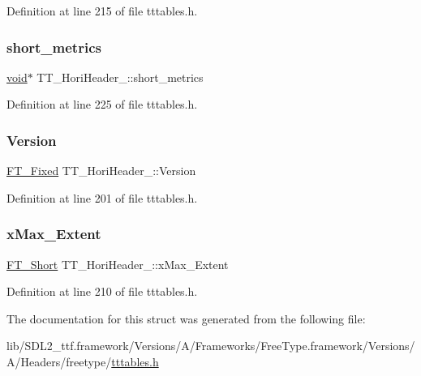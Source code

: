 Definition at line 215 of file tttables.\+h.

\mbox{\label{struct_t_t___hori_header___ae39107c4cfc3e7c1871dbb304bbe4a5a}} 
\subsubsection{\texorpdfstring{short\_metrics}{short\_metrics}}
{\footnotesize\ttfamily \mbox{\hyperlink{_s_d_l__opengles2__gl2ext_8h_ae5d8fa23ad07c48bb609509eae494c95}{void}}$\ast$ T\+T\+\_\+\+Hori\+Header\+\_\+\+::short\+\_\+metrics}



Definition at line 225 of file tttables.\+h.

\mbox{\label{struct_t_t___hori_header___a2d0967448b63db392e35b566196fef97}} 
\subsubsection{\texorpdfstring{Version}{Version}}
{\footnotesize\ttfamily \mbox{\hyperlink{fttypes_8h_a5f5a679cc09f758efdd0d1c5feed3c3d}{F\+T\+\_\+\+Fixed}} T\+T\+\_\+\+Hori\+Header\+\_\+\+::\+Version}



Definition at line 201 of file tttables.\+h.

\mbox{\label{struct_t_t___hori_header___ab483cb323f9adc9d959209a42eb19957}} 
\subsubsection{\texorpdfstring{xMax\_Extent}{xMax\_Extent}}
{\footnotesize\ttfamily \mbox{\hyperlink{fttypes_8h_aa7279be89046a2563cd3d4d6651fbdcf}{F\+T\+\_\+\+Short}} T\+T\+\_\+\+Hori\+Header\+\_\+\+::x\+Max\+\_\+\+Extent}



Definition at line 210 of file tttables.\+h.



The documentation for this struct was generated from the following file\+:\begin{DoxyCompactItemize}
\item 
lib/\+S\+D\+L2\+\_\+ttf.\+framework/\+Versions/\+A/\+Frameworks/\+Free\+Type.\+framework/\+Versions/\+A/\+Headers/freetype/\mbox{\hyperlink{tttables_8h}{tttables.\+h}}\end{DoxyCompactItemize}
